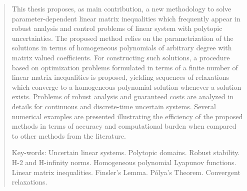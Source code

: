 \begin{quotation}


\noindent This thesis proposes, as main contribution, a new methodology to solve
parameter-dependent linear matrix inequalities which frequently appear in robust
analysis and control problems of linear system with
polytopic uncertainties. The proposed method relies on the parametrization of
the solutions in terms of homogeneous polynomials of arbitrary degree with matrix valued coefficients.
For constructing such solutions, a procedure based on
optimization problems formulated in terms of a finite number of linear
matrix inequalities is proposed, yielding sequences
of relaxations which converge to a homogeneous polynomial solution whenever
a solution exists. Problems of robust analysis and
guaranteed costs are analyzed in details for continuous and
discrete-time uncertain systems. Several numerical examples are
presented illustrating the efficiency of the proposed methods in
terms of accuracy and computational burden when compared to other
methods from the literature.

\vspace*{0.5cm}

\noindent Key-words: Uncertain linear systems. Polytopic domains. Robust stability. H-2 and
H-infinity norms. Homogeneous polynomial Lyapunov functions. Linear matrix inequalities.
Finsler's Lemma. Pólya's Theorem. Convergent relaxations.

\end{quotation}

\null

